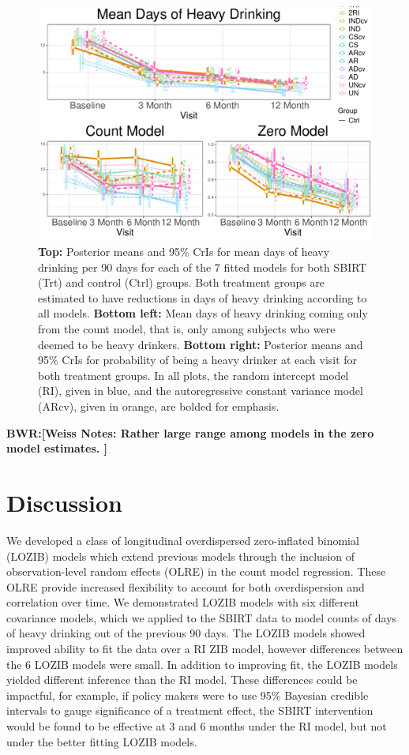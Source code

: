 \documentclass[12pt]{article}
\def\bwr#1{{\color{violet}\textbf{BWR:[#1]}}}
\begin{document}
\begin{figure}[t]
	\centering
	\includegraphics[scale=.5]{figures/MeanAllPlots.pdf}
	\caption{\textbf{Top:} Posterior means and 95\% CrIs for mean days of heavy drinking per 90 days for each of the 7 fitted models for both SBIRT (Trt) and control (Ctrl) groups. Both treatment groups are estimated to have reductions in days of heavy drinking according to all models. \textbf{Bottom left:} Mean days of heavy drinking coming only from the count model, that is, only among subjects who were deemed to be heavy drinkers. \textbf{Bottom right:} Posterior means and 95\% CrIs for probability of being a heavy drinker at each visit for both treatment groups. In all plots, the random intercept model (RI), given in blue, and the autoregressive constant variance model (ARcv), given in orange, are bolded for emphasis.}
	\label{fig:meanplots}
\end{figure}


\bwr{Weiss Notes: Rather large range among models in the zero model estimates. }

\section{Discussion}

We developed a class of longitudinal overdispersed zero-inflated binomial (LOZIB) models which extend previous models through the inclusion of observation-level random effects (OLRE) in the count model regression. These OLRE provide increased flexibility to account for both overdispersion and correlation over time. We demonstrated LOZIB models with six different covariance models, which we applied to the SBIRT data to model counts of days of heavy drinking out of the previous 90 days. The LOZIB models showed improved ability to fit the data over a RI ZIB model, however differences between the 6 LOZIB models were small. In addition to improving fit, the LOZIB models yielded different inference than the RI model. These differences could be impactful, for example, if policy makers were to use 95\% Bayesian credible intervals to gauge significance of a treatment effect, the SBIRT intervention would be found to be effective at 3 and 6 months under the RI model, but not under the better fitting LOZIB models. 
\end{document}

